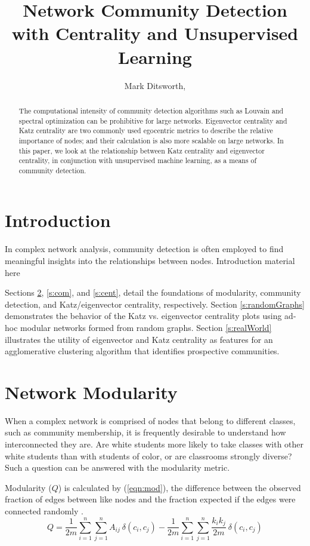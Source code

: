 \documentclass{IEEEtran}
\title{Network Community Detection with Centrality and Unsupervised Learning}
\author{Mark Ditsworth, \textellipsis}
\begin{document}
	\maketitle
	\begin{abstract}
	The computational intensity of community detection algorithms such as Louvain and spectral optimization can be prohibitive for large networks.
	Eigenvector centrality and Katz centrality are two commonly used egocentric metrics to describe the relative importance of nodes; and their calculation is also more scalable on large networks.
	In this paper, we look at the relationship between Katz centrality and eigenvector centrality, in conjunction with unsupervised machine learning, as a means of community detection.
	\end{abstract}
	
	\section{Introduction}
	In complex network analysis, community detection is often employed to find meaningful insights into the relationships between nodes.
	Introduction material here \textellipsis
	
	Sections \ref{s:mod}, \ref{s:com}, and \ref{s:cent}, detail the foundations of modularity, community detection, and Katz/eigenvector centrality, respectively. Section \ref{s:randomGraphs} demonstrates the behavior of the Katz vs. eigenvector centrality plots using ad-hoc modular networks formed from random graphs. Section \ref{s:realWorld} illustrates the utility of eigenvector and Katz centrality as features for an agglomerative clustering algorithm  that identifies prospective communities.
	 
	\section{Network Modularity}
	\label{s:mod}
	When a complex network is comprised of nodes that belong to different classes, such as community membership, it is frequently desirable to understand how interconnected they are. Are white students more likely to take classes with other white students than with students of color, or are classrooms strongly diverse? Such a question can be answered with the modularity metric.
	
	Modularity ($Q$) is calculated by (\ref{eqn:mod}), the difference between the observed fraction of edges between like nodes and the fraction expected if the edges were connected randomly \cite{Mod}.
	\begin{equation}
	\label{eqn:mod}
	Q = \frac{1}{2m}\sum_{i=1}^{n}\sum_{j=1}^{n}A_{ij}~\delta(c_i,c_j) - \frac{1}{2m}\sum_{i=1}^{n}\sum_{j=1}^{n}\frac{k_ik_j}{2m}~\delta(c_i,c_j)
	\end{equation}
	
\end{document}
